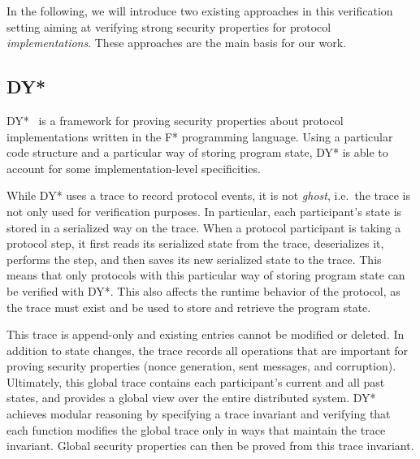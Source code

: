 In the following, we will introduce two existing approaches in this verification setting aiming at verifying strong security properties for protocol \emph{implementations}. These approaches are the main basis for our work.

\subsection{DY*}
\label{sec:dy-star}

DY*~\cite{bhargavan2021text} is a framework for proving security properties about protocol implementations written in the F* programming language.
Using a particular code structure and a particular way of storing program state, DY* is able to account for some implementation-level specificities.

While DY* uses a trace to record protocol events, it is not \emph{ghost}, i.e.\ the trace is not only used for verification purposes.
In particular, each participant's state is stored in a serialized way on the trace.
When a protocol participant is taking a protocol step, it first reads its serialized state from the trace, deserializes it, performs the step, and then saves its new serialized state to the trace.
This means that only protocols with this particular way of storing program state can be verified with DY*.
This also affects the runtime behavior of the protocol, as the trace must exist and be used to store and retrieve the program state.

This trace is append-only and existing entries cannot be modified or deleted. In addition to state changes, the trace records all operations that are important for proving security properties (nonce generation, sent messages, and corruption).
Ultimately, this global trace contains each participant's current and all past states, and provides a global view over the entire distributed system. %
DY* achieves modular reasoning by specifying a trace invariant and verifying that each function modifies the global trace only in ways that maintain the trace invariant. Global security properties can then be proved from this trace invariant.

